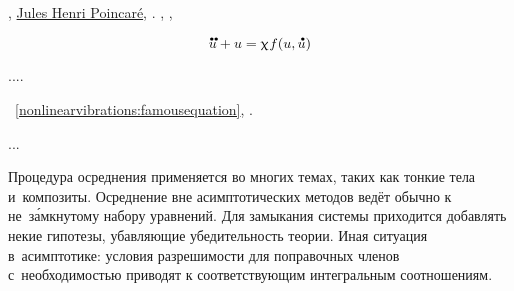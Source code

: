 

,
\href{https://en.wikipedia.org/wiki/Henri_Poincar%C3%A9}{Jules Henri Poincar\'{e}},
.
%
,
,

\nopagebreak\vspace{-0.2em}\begin{equation}\label{nonlinearvibrations:famousequation}
\mathdotdotabove{u} + u = \smallparameter \hspace{.1ex} f(u, \mathdotabove{u})
\end{equation}

....




~\eqref{nonlinearvibrations:famousequation},
\ru{\:---}
.
%

...

\begin{otherlanguage}{russian}

Процедура осреднения применяется во многих темах,
таких как тонкие тела и~композиты.
Осреднение вне асимптотических методов
ведёт обычно к не~з\'{а}мкнутому набору уравнений.
Для замыкания системы приходится добавлять некие гипотезы,
убавляющие убедительность теории.
Иная ситуация в~асимптотике:
условия разрешимости для поправочных членов
с~необходимостью
приводят к соответствующим интегральным соотношениям.

\end{otherlanguage}

